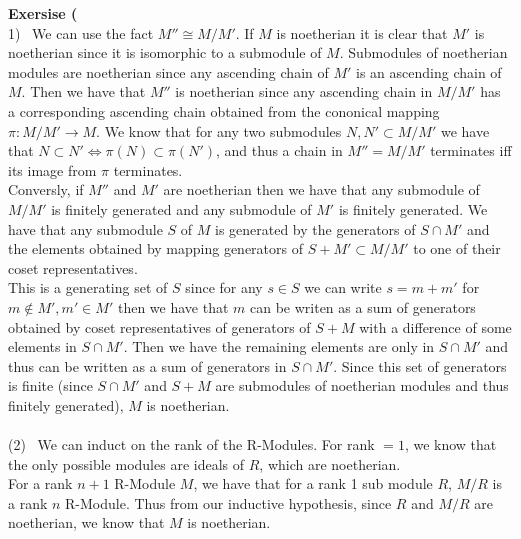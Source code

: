 \documentclass[12pt]{article}
\newenvironment{ques}[1]{\textbf{Exersise #1}\vspace{1 mm}\\ }{\bigskip}
\theoremstyle{definition}
\begin{document}
\begin{ques}{6.3}
	(1) \ We can use the fact $M'' \cong M/M'$. If $M$ is noetherian it is
	clear that $M'$ is noetherian since it is isomorphic to a submodule of $M$.
	Submodules of noetherian modules are noetherian since any ascending chain
	of $M'$ is an ascending chain of $M$. Then we have that $M''$ is noetherian
	since any ascending chain in $M/M'$ has a corresponding ascending chain
	obtained from the cononical mapping $\pi : M/M' \to M$. We know that for
	any two submodules $N, N' \subset M/M'$ we have that $N \subset N'
	\Leftrightarrow \pi(N) \subset \pi(N')$, and thus a chain in $M'' = M/M'$
	terminates iff its image from $\pi$ terminates. \\
	Conversly, if $M''$ and $M'$ are noetherian then we have that any submodule
	of $M/M'$ is finitely generated and any submodule of $M'$ is finitely
	generated. We have that any submodule $S$ of $M$ is generated by the generators
	of $S \cap M'$ and the elements obtained by mapping generators of $S + M'
	\subset M/M'$ to one of their coset representatives.\\
	This is a generating set of $S$ since for any $s \in S$ we can write $s = m
	+ m'$ for $m \notin M', m' \in M'$ then we have that $m$ can be writen as a
	sum of generators obtained by coset representatives of generators of $S + M$
	with a difference of some elements in $S \cap M'$. Then we have the remaining
	elements are only in $S \cap M'$ and thus can be written as a sum of generators in
	$S \cap M'$.  Since this set of generators is finite (since $S \cap M'$ and
	$S + M$ are submodules of noetherian modules and thus finitely generated),
	$M$ is noetherian.\\
	\\
	(2) \ We can induct on the rank of the R-Modules. For rank $= 1$, we know
	that the only possible modules are ideals of $R$, which are noetherian.\\
	For a rank $n + 1$ R-Module $M$, we have that for a rank 1 sub module $R$,
	$M/R$ is a rank $n$ R-Module. Thus from our inductive hypothesis, since $R$
	and $M/R$ are noetherian, we know that $M$ is noetherian. 

\end{ques}
\end{document}
